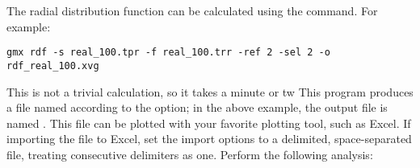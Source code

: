 \documentclass[10pt]{article}
\begin{document}
  The radial distribution function can be calculated using the  command.
  For example:
  \begin{fullwidth}
\begin{Verbatim}
gmx rdf -s real_100.tpr -f real_100.trr -ref 2 -sel 2 -o rdf_real_100.xvg
\end{Verbatim}
    \end{fullwidth}
  This is not a trivial calculation, so it takes a minute or tw
  This program produces a file named according to the  option; in the above example, the output file is named .
  This file can be plotted with your favorite plotting tool, such as Excel.
  If importing the file to Excel, set the import options to a delimited, space-separated file, treating consecutive delimiters as one.
  Perform the following analysis:
\end{document}
